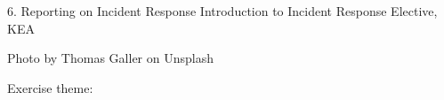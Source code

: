 \documentclass[Screen16to9,17pt]{foils}
\begin{document}
\mytitlepage
{6. Reporting on Incident Response}
{Introduction to Incident Response Elective, KEA}




\begin{list2}
\item
\item
\item
\end{list2}

{\hfill \small Photo by Thomas Galler on Unsplash}


\begin{list2}
\item
\item
\item
\item
\item
\end{list2}

Exercise theme:
\begin{list2}
\item
\item
\item
\end{list2}


\end{document}
